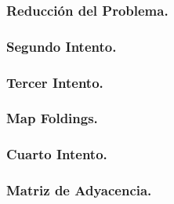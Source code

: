\documentclass{beamer}
\begin{document}
\begin{frame}[t]
	\frametitle{Reducción del Problema.}
\end{frame}

\begin{frame}[t]
	\frametitle{Segundo Intento.}
\end{frame}

\begin{frame}[t]
	\frametitle{Tercer Intento.}
\end{frame}

\begin{frame}[t]
	\frametitle{Map Foldings.}
\end{frame}

\begin{frame}[t]
	\frametitle{Cuarto Intento.}
\end{frame}

\begin{frame}[t]
	\frametitle{Matriz de Adyacencia.}
\end{frame}

\end{document}
